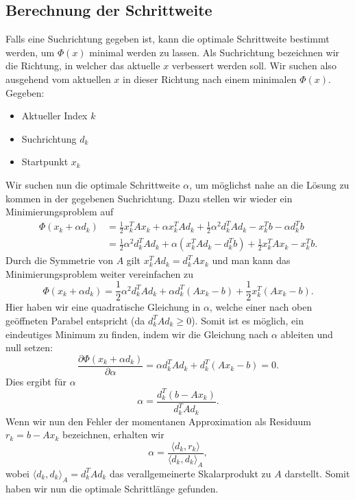 \subsection{Berechnung der Schrittweite \label{cg:subsection:schrittweite}}
Falls eine Suchrichtung gegeben ist, kann die optimale Schrittweite bestimmt werden, um $\Phi(x)$ minimal werden zu lassen.
Als Suchrichtung bezeichnen wir die Richtung, in welcher das aktuelle $x$ verbessert werden soll.
Wir suchen also ausgehend vom aktuellen $x$ in dieser Richtung nach einem minimalen $\Phi(x)$.
Gegeben: 
%
\begin{itemize}
	\item Aktueller Index $k$
	\item Suchrichtung $d_k$
	\item Startpunkt $x_k$
\end{itemize}
Wir suchen nun die optimale Schrittweite $\alpha$, um möglichst nahe an die Lösung zu kommen in der gegebenen Suchrichtung.
Dazu stellen wir wieder ein Minimierungsproblem auf
\begin{align}
	\Phi(x_k + \alpha d_k) 
	&= 
	\frac{1}{2} x_k^T A x_k + \alpha x_k^T A d_k + \frac{1}{2} {\alpha}^2 d_k^T A d_k
	-
	x_k^T b - \alpha d_k^T b \\
	&= \frac{1}{2} {\alpha}^2 d_k^T A d_k + \alpha \left( x_k^T A d_k - d_k^T b \right) + \frac{1}{2} x_k^T A x_k -	x_k^T b.
\end{align}
Durch die Symmetrie von $A$ gilt $x_k^T A d_k = d_k^T A x_k$ und man kann das Minimierungsproblem weiter vereinfachen zu
\begin{equation}
	\Phi(x_k + \alpha d_k) = \frac{1}{2} {\alpha}^2 d_k^T A d_k + \alpha d_k^T\left( A x_k - b \right) + \frac{1}{2} x_k^T \left( A x_k - b \right).
\end{equation}
Hier haben wir eine quadratische Gleichung in $\alpha$, welche einer nach oben geöffneten Parabel entspricht (da $d_k^T A d_k \ge 0$).
%
Somit ist es möglich, ein eindeutiges Minimum zu finden, indem wir die Gleichung nach $\alpha$ ableiten und null setzen:
\begin{equation}
	\frac{\partial \Phi(x_k + \alpha d_k) }{\partial \alpha}
	= 
	\alpha  d_k^T A d_k + d_k^T\left( A x_k - b \right)
	=
	0 .
\end{equation}
Dies ergibt für $\alpha$ 
\begin{equation}
	\alpha
	=
	\frac{d_k^T \left(b - A x_k\right)}{d_k^T A d_k}.
\end{equation}
Wenn wir nun den Fehler der momentanen Approximation als Residuum $r_k = b - A x_k$ bezeichnen, erhalten wir
%
\begin{equation}
	\alpha
	= 
	\frac{\langle d_k , r_k \rangle}{\langle d_k , d_k \rangle_A},
\end{equation}
wobei $\langle d_k , d_k \rangle_A = d_k^T A d_k$ das verallgemeinerte Skalarprodukt zu $A$ darstellt.
%
%
Somit haben wir nun die optimale Schrittlänge gefunden.

